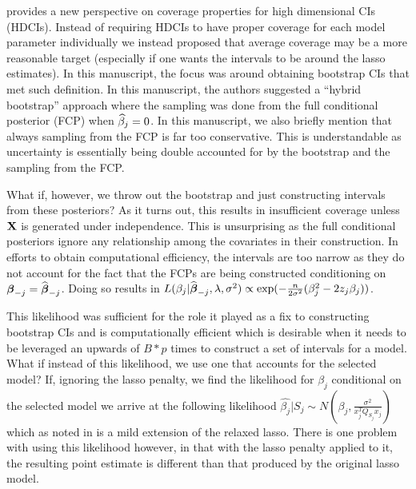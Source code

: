 provides a new perspective on coverage properties for high dimensional CIs (HDCIs). Instead of requiring HDCIs to have proper coverage for each model parameter individually we instead proposed that average coverage may be a more reasonable target (especially if one wants the intervals to be around the lasso estimates). In this manuscript, the focus was around obtaining bootstrap CIs that met such definition. In this manuscript, the authors suggested a ``hybrid bootstrap'' approach where the sampling was done from the full conditional posterior (FCP) when $\widehat{\beta}_j = 0$. In this manuscript, we also briefly mention that always sampling from the FCP is far too conservative. This is understandable as uncertainty is essentially being double accounted for by the bootstrap and the sampling from the FCP. 

What if, however, we throw out the bootstrap and just constructing intervals from these posteriors? As it turns out, this results in insufficient coverage unless $\mathbf{X}$ is generated under independence. This is unsurprising as the full conditional posteriors ignore any relationship among the covariates in their construction. In efforts to obtain computational efficiency, the intervals are too narrow as they do not account for the fact that the FCPs are being constructed conditioning on $\boldsymbol{\beta}_{-j} = \widehat{\boldsymbol{\beta}}_{-j}$. Doing so results in $L(\beta_j|\widehat{\boldsymbol{\beta}}_{-j}, \lambda, \sigma^2) \propto \exp(-\frac{n}{2\sigma^2}(\beta_{j}^2 - 2 z_{j} \beta_{j}))$.

This likelihood was sufficient for the role it played as a fix to constructing bootstrap CIs and is computationally efficient which is desirable when it needs to be leveraged an upwards of $B*p$ times to construct a set of intervals for a model. What if instead of this likelihood, we use one that accounts for the selected model? If, ignoring the lasso penalty, we find the likelihood for $\beta_j$ conditional on the selected model we arrive at the following likelihood $\hat{\beta_j} | S_j \sim N(\beta_j, \frac{\sigma^2}{x_j^T Q_{S_j} x_j})$ which as noted in  is a mild extension of the relaxed lasso. There is one problem with using this likelihood however, in that with the lasso penalty applied to it, the resulting point estimate is different than that produced by the original lasso model. 

